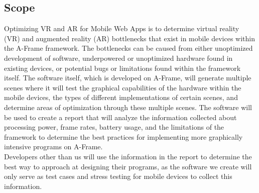 \documentclass[letterpaper,10pt,titlepage,draftclsnofoot,onecolumn,compsoc,utf8,latin1]{IEEEtran}
\begin{document}
\subsection{Scope}
\begin{singlespace}
\noindent
Optimizing VR and AR for Mobile Web Apps is to determine virtual reality (VR) and augmented reality (AR) bottlenecks that exist in mobile devices within the A-Frame framework. The bottlenecks can be caused from either unoptimized development of software, underpowered or unoptimized hardware found in existing devices, or potential bugs or limitations found within the framework itself. The software itself, which is developed on A-Frame, will generate multiple scenes where it will test the graphical capabilities of the hardware within the mobile devices, the types of different implementations of certain scenes, and determine areas of optimization through these multiple scenes. The software will be used to create a report that will analyze the information collected about processing power, frame rates, battery usage, and the limitations of the framework to determine the best practices for implementing more graphically intensive programs on A-Frame. \\

\noindent
Developers other than us will use the information in the report to determine the best way to approach at designing their programs, as the software we create will only serve as test cases and stress testing for mobile devices to collect this information. 
\end{singlespace}
\end{document}
